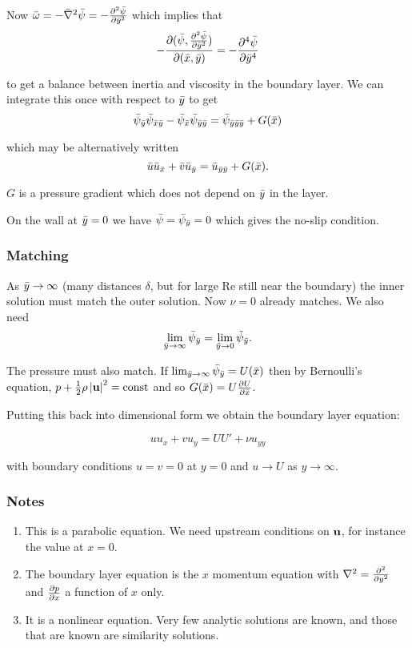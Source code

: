 \documentclass{notes}
\newcommand{\Rey}{\mathrm{Re}}
\theoremstyle{plain}
\begin{document}
Now $\Bar{\omega} = - \Bar{\nabla}^2 \Bar{\psi} = - \frac{\partial ^2 \Bar{\psi}}{\partial 
\Bar{y}^2}$ which implies that
\[
- \frac{\partial (\Bar{\psi}, \frac{\partial ^2 \Bar{\psi}}{\partial 
\Bar{y}^2})}{\partial (\Bar{x},\Bar{y})} = - \frac{\partial ^4 \Bar{\psi}}{\partial \Bar{y}^4}
\]

to get a balance between inertia and viscosity in the boundary layer.
We can integrate this once with respect to $\Bar{y}$ to get
\[
\Bar{\psi}_{\Bar{y}} \Bar{\psi}_{\Bar{x}\Bar{y}}
- \Bar{\psi}_{\Bar{x}} \Bar{\psi}_{\Bar{y}\Bar{y}}
= \Bar{\psi}_{\Bar{y} \Bar{y} \Bar{y}} + G(\Bar{x})
\]

which may be alternatively written
\[
\Bar{u} \Bar{u}_{\Bar{x}} + \Bar{v} \Bar{u}_{\Bar{y}}
= \Bar{u}_{\Bar{y} \Bar{y}} + G(\Bar{x}).
\]

$G$ is a pressure gradient which does not depend on $\Bar{y}$ in the
layer.

On the wall at $\Bar{y} = 0$ we have $\Bar{\psi} = \Bar{\psi}_{\Bar{y}} = 0$
which gives the no-slip condition.

\subsubsection*{Matching}

As $\Bar{y} \to \infty$ (many distances $\delta$, but for large $\Rey$
still near the boundary) the inner solution must match the outer solution.
Now $\nu = 0$ already matches.  We also need
\[
\lim_{\Bar{y} \to \infty} \Bar{\psi}_{\Bar{y}}
= \lim_{\Tilde{y} \to 0} \Tilde{\psi}_{\Tilde{y}}.
\]

The pressure must also match.  If $\lim_{\Bar{y} \to \infty}
\Bar{\psi}_{\Bar{y}} = U(\Bar{x})$ then by Bernoulli's equation,
$p + \tfrac{1}{2} \rho \left|\mathbf{u}\right|^2 = \text{const}$ and so $G(\Bar{x}) =
U \frac{\partial U}{\partial \Bar{x}}$.

Putting this back into dimensional form we obtain the boundary layer
equation:

\begin{equation}\label{eq:bdylayer}
u u_x + v u_y = U U' + \nu u_{y y}
\end{equation}

with boundary conditions $u = v = 0$ at $y = 0$ and
$u \to U$ as $y \to \infty$.

\subsubsection*{Notes}

\begin{enumerate}
\item This is a parabolic equation.  We need upstream conditions on $\mathbf{u}$, for
instance the value at $x = 0$.
\item The boundary layer equation is the $x$ momentum equation with
$\nabla^2 = \frac{\partial ^2}{\partial y^2}$ and $\frac{\partial p}{\partial x}$ a function of $x$ only.
\item It is a nonlinear equation.  Very few analytic solutions are known,
and those that are known are similarity solutions.
\end{enumerate}
\end{document}
